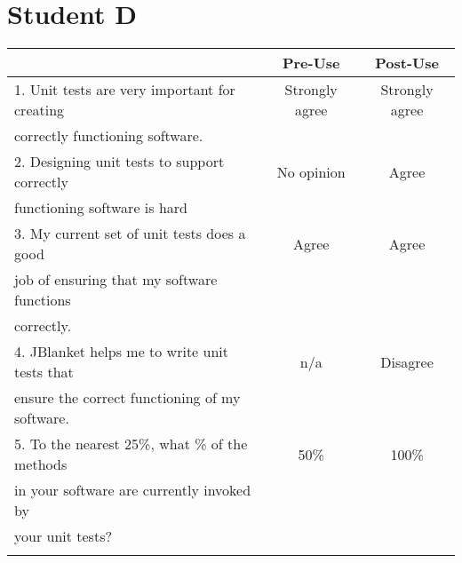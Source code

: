 \section{Student D}

\begin{tabular}{lcc} \\
 & {\bf Pre-Use} & {\bf Post-Use} \\ \hline
1. Unit tests are very important for creating & Strongly agree & Strongly agree \\
   correctly functioning software. \\ \hline

2. Designing unit tests to support correctly & No opinion & Agree \\
   functioning software is hard\\ \hline

3. My current set of unit tests does a good & Agree & Agree \\
   job of ensuring that my software functions \\
   correctly.\\ \hline

4. JBlanket helps me to write unit tests that & n/a & Disagree \\
   ensure the correct functioning of my software.\\ \hline

5. To the nearest 25\%, what \% of the methods & 50\% & 100\% \\
   in your software are currently invoked by \\
   your unit tests?\\ \hline
\\
\end{tabular}

